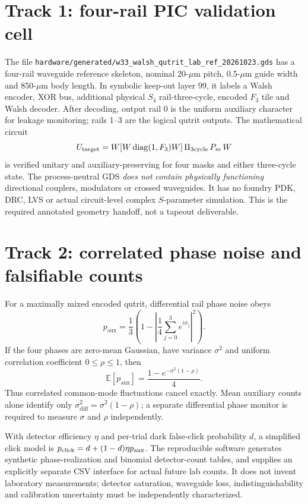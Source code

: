 \documentclass[10pt]{article}
\begin{document}
\section{Track 1: four-rail PIC validation cell}
The file
\texttt{hardware/generated/w33\_walsh\_qutrit\_lab\_ref\_20261023.gds}
has a four-rail waveguide reference skeleton,
nominal 20-$\mu$m pitch, 0.5-$\mu$m guide width and
850-$\mu$m body length. In symbolic keep-out layer 99,
it labels a Walsh encoder, XOR bus, additional physical
$S_4$ rail-three-cycle, encoded $F_3$ tile and Walsh decoder.
After decoding, output rail 0 is the uniform auxiliary
character for leakage monitoring; rails 1--3 are the
logical qutrit outputs. The mathematical circuit
\[
U_{\rm target}=W[W\operatorname{diag}(1,F_3)W]\,
\Pi_{\rm 3cycle}\,P_m\,W
\]
is verified unitary and auxiliary-preserving for four
masks and either three-cycle state. The process-neutral
GDS \emph{does not contain physically functioning}
directional couplers, modulators or crossed waveguides.
It has no foundry PDK, DRC, LVS or actual circuit-level
complex $S$-parameter simulation. This is the required
annotated geometry handoff, not a tapeout deliverable.

\section{Track 2: correlated phase noise and falsifiable counts}
For a maximally mixed encoded qutrit, differential rail
phase noise obeys
\[
p_{\mathrm{aux}}=
\frac13\left(1-\left|
\frac14\sum_{j=0}^{3}e^{i\phi_j}\right|^2\right).
\]
If the four phases are zero-mean Gaussian, have variance
$\sigma^2$ and uniform correlation coefficient
$0\le\rho\le1$, then
\[
\boxed{\mathbb E[p_{\mathrm{aux}}]
  =\frac{1-e^{-\sigma^2(1-\rho)}}4.}
\]
Thus correlated common-mode fluctuations cancel exactly.
Mean auxiliary counts alone identify only
$\sigma_{\mathrm{diff}}^2=\sigma^2(1-\rho)$;
a separate differential phase monitor is required to
measure $\sigma$ and $\rho$ independently.

With detector efficiency $\eta$ and per-trial dark
false-click probability $d$, a simplified click model is
$p_{\rm click}=d+(1-d)\eta p_{\rm aux}$.
The reproducible software generates synthetic
phase-realization and binomial detector-count tables,
and supplies an explicitly separate CSV interface
for actual future lab counts. It does not invent
laboratory measurements; detector saturation,
waveguide loss, indistinguishability and calibration
uncertainty must be independently characterized.
\end{document}
